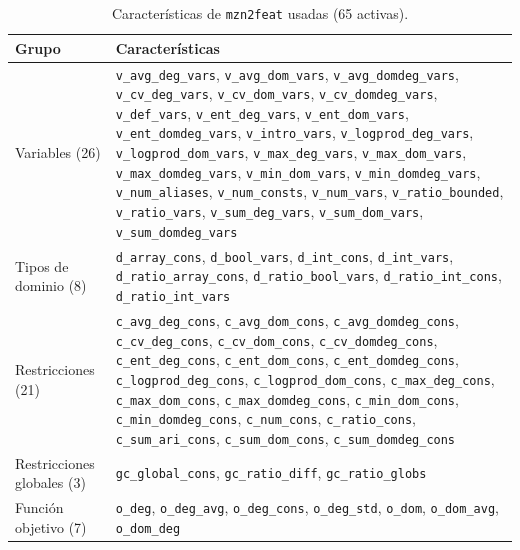\begin{table}[H]
  \centering
  \scriptsize
  \singlespacing
  \caption{Características de \texttt{mzn2feat} usadas (65 activas).}
  \label{tab:anexo_activas}
  \begin{tabularx}{\textwidth}{>{\raggedright\arraybackslash}p{2.6cm} >{\raggedright\arraybackslash}X}
    \toprule
    \textbf{Grupo} & \textbf{Características} \\
    \midrule
    Variables (26) & \texttt{v\_avg\_deg\_vars}, \texttt{v\_avg\_dom\_vars}, \texttt{v\_avg\_domdeg\_vars}, \texttt{v\_cv\_deg\_vars}, \texttt{v\_cv\_dom\_vars}, \texttt{v\_cv\_domdeg\_vars}, \texttt{v\_def\_vars}, \texttt{v\_ent\_deg\_vars}, \texttt{v\_ent\_dom\_vars}, \texttt{v\_ent\_domdeg\_vars}, \texttt{v\_intro\_vars}, \texttt{v\_logprod\_deg\_vars}, \texttt{v\_logprod\_dom\_vars}, \texttt{v\_max\_deg\_vars}, \texttt{v\_max\_dom\_vars}, \texttt{v\_max\_domdeg\_vars}, \texttt{v\_min\_dom\_vars}, \texttt{v\_min\_domdeg\_vars}, \texttt{v\_num\_aliases}, \texttt{v\_num\_consts}, \texttt{v\_num\_vars}, \texttt{v\_ratio\_bounded}, \texttt{v\_ratio\_vars}, \texttt{v\_sum\_deg\_vars}, \texttt{v\_sum\_dom\_vars}, \texttt{v\_sum\_domdeg\_vars} \\
    Tipos de dominio (8) & \texttt{d\_array\_cons}, \texttt{d\_bool\_vars}, \texttt{d\_int\_cons}, \texttt{d\_int\_vars}, \texttt{d\_ratio\_array\_cons}, \texttt{d\_ratio\_bool\_vars}, \texttt{d\_ratio\_int\_cons}, \texttt{d\_ratio\_int\_vars} \\
    Restricciones (21) & \texttt{c\_avg\_deg\_cons}, \texttt{c\_avg\_dom\_cons}, \texttt{c\_avg\_domdeg\_cons}, \texttt{c\_cv\_deg\_cons}, \texttt{c\_cv\_dom\_cons}, \texttt{c\_cv\_domdeg\_cons}, \texttt{c\_ent\_deg\_cons}, \texttt{c\_ent\_dom\_cons}, \texttt{c\_ent\_domdeg\_cons}, \texttt{c\_logprod\_deg\_cons}, \texttt{c\_logprod\_dom\_cons}, \texttt{c\_max\_deg\_cons}, \texttt{c\_max\_dom\_cons}, \texttt{c\_max\_domdeg\_cons}, \texttt{c\_min\_dom\_cons}, \texttt{c\_min\_domdeg\_cons}, \texttt{c\_num\_cons}, \texttt{c\_ratio\_cons}, \texttt{c\_sum\_ari\_cons}, \texttt{c\_sum\_dom\_cons}, \texttt{c\_sum\_domdeg\_cons} \\
    Restricciones globales (3) & \texttt{gc\_global\_cons}, \texttt{gc\_ratio\_diff}, \texttt{gc\_ratio\_globs} \\
    Función objetivo (7) & \texttt{o\_deg}, \texttt{o\_deg\_avg}, \texttt{o\_deg\_cons}, \texttt{o\_deg\_std}, \texttt{o\_dom}, \texttt{o\_dom\_avg}, \texttt{o\_dom\_deg} \\
    \bottomrule
  \end{tabularx}
\end{table}
